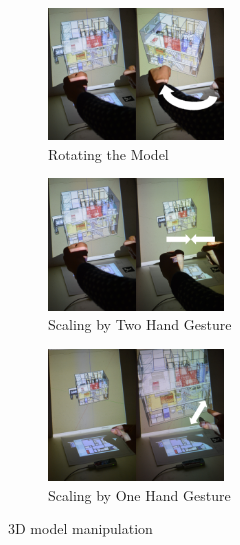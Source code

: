 \begin{figure}[t!]
    \centering
        \begin{subfigure}[b]{0.32\textwidth}
            \centering
                \includegraphics[width=\textwidth, height=3.5cm]{4-Interaction_Design/3d_rotation_1}
                \caption{Rotating the Model}
                \label{fig:rotate}
        \end{subfigure}%
        \hfill
        \begin{subfigure}[b]{0.32\textwidth}
            \centering
            \includegraphics[width=\textwidth, height=3.5cm]{4-Interaction_Design/3d_scale}
                \caption{Scaling by Two Hand Gesture}
                \label{fig:scale_two_hand}
        \end{subfigure}
        \hfill
        \begin{subfigure}[b]{0.32\textwidth}
            \centering
            \includegraphics[width=\textwidth, height=3.5cm]{4-Interaction_Design/3d_scale_pinch}
                \caption{Scaling by One Hand Gesture}
                \label{fig:scale_pinch}
        \end{subfigure}
    \caption{3D model manipulation}
    \label{fig:3d_mani}
\end{figure}

